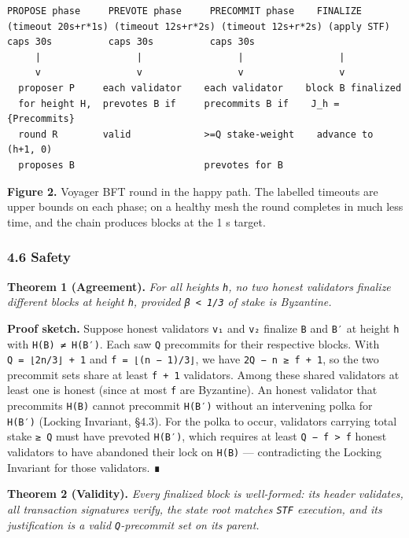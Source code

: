 \documentclass[11pt,a4paper]{article}
\newenvironment{Shaded}{}{}
\begin{document}
\begin{Shaded}
\begin{verbatim}
PROPOSE phase     PREVOTE phase     PRECOMMIT phase    FINALIZE
(timeout 20s+r*1s) (timeout 12s+r*2s) (timeout 12s+r*2s) (apply STF)
caps 30s          caps 30s          caps 30s
     |                 |                 |                 |
     v                 v                 v                 v
  proposer P     each validator    each validator    block B finalized
  for height H,  prevotes B if     precommits B if    J_h = {Precommits}
  round R        valid             >=Q stake-weight    advance to (h+1, 0)
  proposes B                       prevotes for B
\end{verbatim}
\end{Shaded}

\textbf{Figure 2.} Voyager BFT round in the happy path. The labelled
timeouts are upper bounds on each phase; on a healthy mesh the round
completes in much less time, and the chain produces blocks at the 1 s
target.

\hypertarget{46-safety}{%
\subsubsection{4.6 Safety}\label{46-safety}}

\textbf{Theorem 1 (Agreement).} \emph{For all heights \texttt{h}, no two
honest validators finalize different blocks at height \texttt{h},
provided \texttt{β\ \textless{}\ 1/3} of stake is Byzantine.}

\textbf{Proof sketch.} Suppose honest validators \texttt{v₁} and
\texttt{v₂} finalize \texttt{B} and \texttt{B′} at height \texttt{h}
with \texttt{H(B)\ ≠\ H(B′)}. Each saw \texttt{Q} precommits for their
respective blocks. With \texttt{Q\ =\ ⌊2n/3⌋\ +\ 1} and
\texttt{f\ =\ ⌊(n\ −\ 1)/3⌋}, we have \texttt{2Q\ −\ n\ ≥\ f\ +\ 1}, so
the two precommit sets share at least \texttt{f\ +\ 1} validators. Among
these shared validators at least one is honest (since at most \texttt{f}
are Byzantine). An honest validator that precommits \texttt{H(B)} cannot
precommit \texttt{H(B′)} without an intervening polka for \texttt{H(B′)}
(Locking Invariant, §4.3). For the polka to occur, validators carrying
total stake \texttt{≥\ Q} must have prevoted \texttt{H(B′)}, which
requires at least \texttt{Q\ −\ f\ \textgreater{}\ f} honest validators
to have abandoned their lock on \texttt{H(B)} --- contradicting the
Locking Invariant for those validators. ∎

\textbf{Theorem 2 (Validity).} \emph{Every finalized block is
well-formed: its header validates, all transaction signatures verify,
the state root matches \texttt{STF} execution, and its justification is
a valid \texttt{Q}-precommit set on its parent.}
\end{document}
